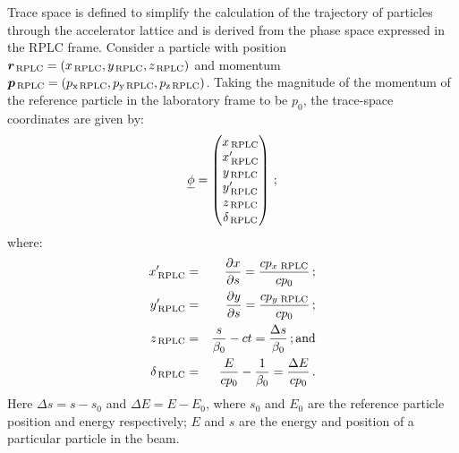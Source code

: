 Trace space is defined to simplify the calculation of the trajectory
of particles through the accelerator lattice and is derived from the
phase space expressed in the RPLC frame.
Consider a particle with position
$\bm{r}_{\rm\,RPLC}=(x_{\rm\,RPLC}, y_{\rm\,RPLC}, z_{\rm\,RPLC})$ and
momentum
$\bm{p}_{\rm\,RPLC} = (p_{\rm x\,RPLC}, p_{\rm y\,RPLC}, p_{\rm z\,RPLC})$.
Taking the magnitude of the momentum of the reference particle in the
laboratory frame to be $p_0$, the trace-space coordinates are given
by:
\begin{equation}
    \underline{\phi} = \begin{pmatrix}
                        x_{\rm\,RPLC}       \\
                        x^\prime_{\rm\,RPLC} \\
                        y_{\rm\,RPLC}       \\
                        y^\prime_{\rm\,RPLC} \\
                        z_{\rm\,RPLC}       \\
                        \delta_{\rm\,RPLC}
                      \end{pmatrix} \, ;
\end{equation}
where:
\begin{eqnarray}
  x^\prime_{\rm\,RPLC}  & = & \frac{\partial x}{\partial s}
                        = \frac{cp_{x\,{\rm\,RPLC}}}{cp_0} \, ; \\
  y^\prime_{\rm\,RPLC}  & = & \frac{\partial y}{\partial s}
                        = \frac{cp_{y\,{\rm\,RPLC}}}{cp_0} \, ; \\
  z_{\rm\,RPLC}        & = & \frac{s}{\beta_0} - ct
                       = \frac{\Delta s}{\beta_0}             \, {\rm ; and} \\
  \delta_{\rm\,RPLC}   & = & \frac{E}{c p_0} - \frac{1}{\beta_0}
                        = \frac{\Delta E}{cp_0}                   \, .    
\end{eqnarray}
Here $\Delta s = s - s_0$ and $\Delta E = E - E_0$, where $s_0$ and
$E_0$ are the reference particle position and energy respectively; $E$
and $s$ are the energy and position of a particular particle in the
beam.
